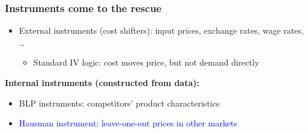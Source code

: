 \documentclass[notes,11pt, aspectratio=169]{beamer}
\begin{document}
\begin{frame}
\frametitle{Instruments come to the rescue}

\begin{itemize}
    \item External instruments (cost shifters): input prices, exchange rates, wage rates, \ldots
   \begin{itemize}
        \item Standard IV logic: cost moves price, but not demand directly
   \end{itemize}
\end{itemize}

\vspace{0.4cm}

\textbf{Internal instruments (constructed from data):}

\begin{itemize}
    \item BLP instruments: competitors' product characteristics
    \item \textcolor{blue}{Hausman instrument: leave-one-out prices in other markets}
\end{itemize}


\end{frame}
\end{document}
